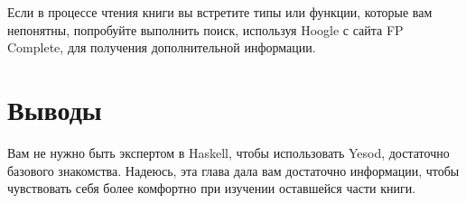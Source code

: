 Если в процессе чтения книги вы встретите типы или функции, которые вам
непонятны, попробуйте выполнить поиск, используя Hoogle с сайта FP Complete, для
получения дополнительной информации.

\section{Выводы}

Вам не нужно быть экспертом в Haskell, чтобы использовать Yesod, достаточно
базового знакомства. Надеюсь, эта глава дала вам достаточно информации, чтобы
чувствовать себя более комфортно при изучении оставшейся части книги.
